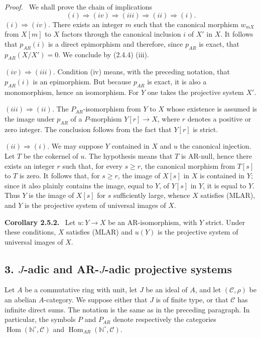 \documentclass[11pt]{article}
\providecommand{\NN}{\mathbb{N}}
\newenvironment{statement}[1]{\par\medskip\noindent\textbf{#1.}\ }{\par\medskip}
\newenvironment{prooftext}[1][Proof]{\par\noindent\emph{#1.}\ }{\par\medskip}
\DeclareMathOperator{\Hom}{Hom}
\providecommand{\Hom}{\operatorname{Hom}}
\providecommand{\NN}{\mathbb N}
\providecommand{\cC}{\mathcal C}
\providecommand{\cC}{\mathcal C}
\begin{document}
\begin{prooftext}[Proof]
We shall prove the chain of implications
\[
(i)\Rightarrow(iv)\Rightarrow(iii)\Rightarrow(ii)\Rightarrow(i).
\]
$(i)\Rightarrow(iv)$. There exists an integer $m$ such that the canonical morphism $w_{mX}$ from $X[m]$ to $X$ factors through the canonical inclusion $i$ of $X'$ in $X$. It follows that $p_{AR}(i)$ is a direct epimorphism and therefore, since $p_{AR}$ is exact, that $p_{AR}(X/X')=0$. We conclude by (2.4.4) (iii).

$(iv)\Rightarrow(iii)$. Condition (iv) means, with the preceding notation, that $p_{AR}(i)$ is an epimorphism. But because $p_{AR}$ is exact, it is also a monomorphism, hence an isomorphism. For $Y$ one takes the projective system $X'$.

$(iii)\Rightarrow(ii)$. The $P_{AR}$-isomorphism from $Y$ to $X$ whose existence is assumed is the image under $p_{AR}$ of a $P$-morphism $Y[r]\to X$, where $r$ denotes a positive or zero integer. The conclusion follows from the fact that $Y[r]$ is strict.

$(ii)\Rightarrow(i)$. We may suppose $Y$ contained in $X$ and $u$ the canonical injection. Let $T$ be the cokernel of $u$. The hypothesis means that $T$ is AR-null, hence there exists an integer $r$ such that, for every $s\ge r$, the canonical morphism from $T[s]$ to $T$ is zero. It follows that, for $s\ge r$, the image of $X[s]$ in $X$ is contained in $Y$; since it also plainly contains the image, equal to $Y$, of $Y[s]$ in $Y$, it is equal to $Y$. Thus $Y$ is the image of $X[s]$ for $s$ sufficiently large, whence $X$ satisfies (MLAR), and $Y$ is the projective system of universal images of $X$.
\end{prooftext}

\begin{statement}{Corollary 2.5.2}
Let $u:Y\to X$ be an AR-isomorphism, with $Y$ strict. Under these conditions, $X$ satisfies (MLAR) and $u(Y)$ is the projective system of universal images of $X$.
\end{statement}

\subsection*{3. $J$-adic and AR-$J$-adic projective systems}
Let $A$ be a commutative ring with unit, let $J$ be an ideal of $A$, and let $(\cC,\rho)$ be an abelian $A$-category. We suppose either that $J$ is of finite type, or that $\cC$ has infinite direct sums. The notation is the same as in the preceding paragraph. In particular, the symbols $P$ and $P_{AR}$ denote respectively the categories $\Hom(\NN^\circ,\cC)$ and $\Hom_{AR}(\NN^\circ,\cC)$.
\end{document}
